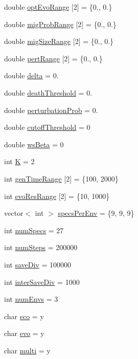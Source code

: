 \begin{DoxyCompactItemize}
\item 
double \hyperlink{structsimParams_a2822e99362ed71f123e812a8fd9ad443}{opt\+Evo\+Range} \mbox{[}2\mbox{]} = \{0., 0.\}
\item 
double \hyperlink{structsimParams_a4a67c773b31598604c56efc130a69945}{mig\+Prob\+Range} \mbox{[}2\mbox{]} = \{0., 0.\}
\item 
double \hyperlink{structsimParams_a2486796d56e9fbe5d9f2dbd507a6ce5d}{mig\+Size\+Range} \mbox{[}2\mbox{]} = \{0., 0.\}
\item 
double \hyperlink{structsimParams_a9b9d328e41381a83004b5fa062248fc7}{pert\+Range} \mbox{[}2\mbox{]} = \{0., 0.\}
\item 
double \hyperlink{structsimParams_a1d2d1053c8780cea2eb1f703b1bcafd0}{delta} = 0.
\item 
double \hyperlink{structsimParams_aec04ef00f25e3bb5585a7a4b50c32b9a}{death\+Threshold} = 0.
\item 
double \hyperlink{structsimParams_aa07ddc0d55d057a586dc98ffd113e064}{perturbation\+Prob} = 0.
\item 
double \hyperlink{structsimParams_a11c37c3a1d0f6470dd7b7c25fe7a8d11}{cutoff\+Threshold} = 0
\item 
double \hyperlink{structsimParams_aa538c5bbac4966493cf3d847ef56906a}{ws\+Beta} = 0
\item 
int \hyperlink{structsimParams_a31066db5156bfb80ea66ef46ee263d39}{K} = 2
\item 
int \hyperlink{structsimParams_ace2069f1d65920fe32e4236c12e91ea9}{gen\+Time\+Range} \mbox{[}2\mbox{]} = \{100, 2000\}
\item 
int \hyperlink{structsimParams_a4121b97ac4b40f6d309693847309ce6b}{evo\+Res\+Range} \mbox{[}2\mbox{]} = \{10, 1000\}
\item 
vector$<$ int $>$ \hyperlink{structsimParams_aede5150c0b33bacae326638341a4e906}{specs\+Per\+Env} = \{9, 9, 9\}
\item 
int \hyperlink{structsimParams_a83b3c9f8e5dee0b7b4e63a17dc2646bd}{num\+Specs} = 27
\item 
int \hyperlink{structsimParams_a027234312109ab21e3f8dacda4039c9f}{num\+Steps} = 200000
\item 
int \hyperlink{structsimParams_ad9fb5fcc3890d022270dbe00ec3a7c1e}{save\+Div} = 100000
\item 
int \hyperlink{structsimParams_a2114f7c6664772255e0e8afcf9334ebf}{inter\+Save\+Div} = 1000
\item 
int \hyperlink{structsimParams_a5d284deecb9cbd1b2680670822cae29a}{num\+Envs} = 3
\item 
char \hyperlink{structsimParams_ac1a96378c33a770e34ffba03498735c9}{eco} = \textquotesingle{}y\textquotesingle{}
\item 
char \hyperlink{structsimParams_a26cb871bb244145cf0b4d1754864f276}{evo} = \textquotesingle{}y\textquotesingle{}
\item 
char \hyperlink{structsimParams_a2c0a57da585258a84362a2c297ee44cb}{multi} = \textquotesingle{}y\textquotesingle{}
\end{DoxyCompactItemize}


